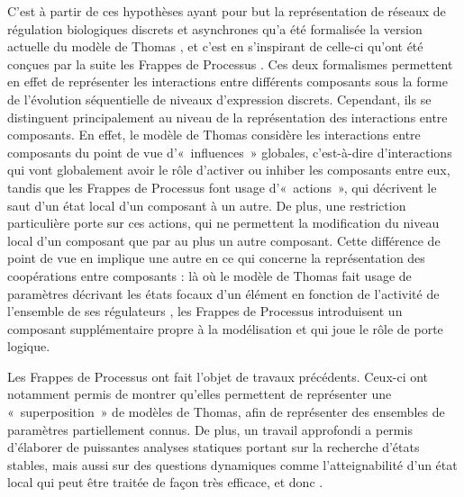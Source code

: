 C'est à partir de ces hypothèses
ayant pour but la représentation de réseaux de régulation biologiques discrets et asynchrones
qu'a été formalisée
la version actuelle du modèle de Thomas \cite{Richard06},
et c'est en s'inspirant de celle-ci qu'ont été conçues par la suite
les Frappes de Processus \cite{PMR10-TCSB}.
Ces deux formalismes permettent en effet
de représenter les interactions entre différents composants
sous la forme de l'évolution séquentielle de niveaux d'expression discrets.
Cependant, ils se distinguent principalement au niveau de la représentation
des interactions entre composants.
En effet, le modèle de Thomas considère les interactions entre composants du point
de vue d'«~influences~» globales, c'est-à-dire d'interactions qui vont globalement avoir
le rôle d'activer ou inhiber les composants entre eux,
tandis que les Frappes de Processus font usage d'«~actions~»,
qui décrivent le saut d'un état local d'un composant à un autre.
De plus, une restriction particulière porte sur ces actions,
qui ne permettent la modification du niveau local d'un composant
que par au plus un autre composant.
Cette différence de point de vue en implique une autre en ce qui concerne la représentation
des coopérations entre composants :
là où le modèle de Thomas fait usage de paramètres décrivant
les états focaux d'un élément en fonction de l'activité de l'ensemble de ses régulateurs
\cite{Snoussi89},
les Frappes de Processus introduisent un composant supplémentaire propre à la modélisation
et qui joue le rôle de porte logique.

Les Frappes de Processus ont fait l'objet de travaux précédents.
Ceux-ci ont notamment permis de montrer qu'elles permettent de représenter une «~superposition~»
de modèles de Thomas, afin de représenter des ensembles de paramètres partiellement connus.
De plus, un travail approfondi a permis d'élaborer de puissantes analyses statiques
portant sur la recherche d'états stables,
mais aussi sur des questions dynamiques comme l'atteignabilité d'un état local \cite{PMR12-MSCS}
qui peut être traitée de façon très efficace, et donc .





